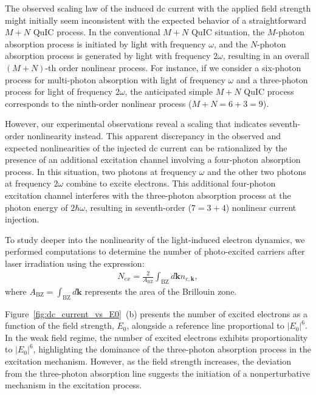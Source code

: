 The observed scaling law of the induced dc current with the applied field strength might initially
seem inconsistent with the expected behavior of a straightforward $M+N$ \gls{QuIC} process. In the
conventional $M+N$ \gls{QuIC} situation, the $M$-photon absorption process is initiated by light with frequency $\omega$, and the $N$-photon absorption process is generated by light with frequency $2\omega$, resulting in an overall $(M+N)$-th order nonlinear process. For instance, if we consider a six-photon process for multi-photon absorption with light of frequency $\omega$ and a three-photon process for light of frequency $2\omega$, the anticipated simple $M+N$ QuIC process corresponds to the ninth-order nonlinear process ($M+N=6+3=9$).

However, our experimental observations reveal a scaling that indicates seventh-order nonlinearity instead. This apparent discrepancy in the observed and expected nonlinearities of the injected dc current can be rationalized by the presence of an additional excitation channel involving a four-photon absorption process. In this situation, two photons at frequency $\omega$ and the other two photons at frequency $2\omega$ combine to excite electrons. This additional four-photon excitation channel interferes with the three-photon absorption process at the photon energy of $2\hbar \omega$, resulting in seventh-order ($7=3+4$) nonlinear current injection.

To study deeper into the nonlinearity of the light-induced electron dynamics, we performed computations to determine the number of photo-excited carriers after laser irradiation using the expression:
\begin{align}
N_{ex} = \frac{2}{A_{\mathrm{BZ}}}\int_{\mathrm{BZ}} d\mathbf{k} n_{c,\mathbf{k}}, 
\end{align}
where $A_{\mathrm{BZ}}=\int_{\mathrm{BZ}} d\mathbf{k}$ represents the area of the Brillouin zone.

Figure~\ref{fig:dc_current_vs_E0}~(b) presents the number of excited electrons as a function of the field strength, $E_0$, alongside a reference line proportional to $|E_0|^6$. In the weak field regime, the number of excited electrons exhibits proportionality to $|E_0|^6$, highlighting the dominance of the three-photon absorption process in the excitation mechanism. However, as the field strength increases, the deviation from the three-photon absorption line suggests the initiation of a nonperturbative mechanism in the excitation process.

